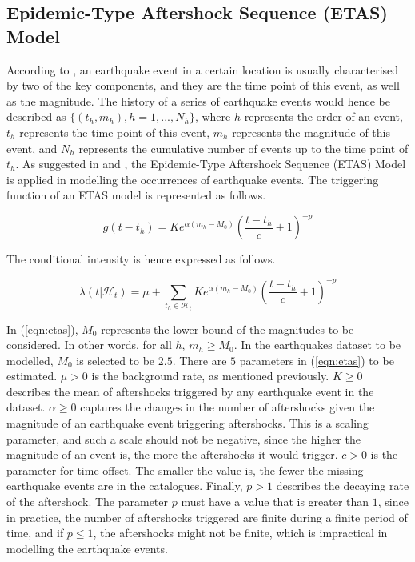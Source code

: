 \documentclass[11pt,twoside]{article}
\numberwithin{Theorem}{section}
\numberwithin{Definition}{section}
\numberwithin{Lemma}{section}
\numberwithin{Algorithm}{section}
\numberwithin{equation}{section}
\begin{document}
\subsection{Epidemic-Type Aftershock Sequence (ETAS) Model}
According to \cite{usgsPredictEarthquakes}, an earthquake event in a certain location is usually characterised by two of the key components, and they are the time point of this event, as well as the magnitude. The history of a series of earthquake events would hence be described as $\{ (t_h, m_h), h = 1, ..., N_h \}$, where $h$ represents the order of an event, $t_h$ represents the time point of this event, $m_h$ represents the magnitude of this event, and $N_h$ represents the cumulative number of events up to the time point of $t_h$. As suggested in \cite{edinburghseismicityhubTemporalModeld} and \cite{serafini2023approximation}, the Epidemic-Type Aftershock Sequence (ETAS) Model is applied in modelling the occurrences of earthquake events. The triggering function of an ETAS model is represented as follows.

\begin{equation}\label{eqn:etas_tri}
g(t-t_h)=Ke^{\alpha(m_h-M_0)}(\frac{t-t_h}{c}+1)^{-p}
\end{equation}

The conditional intensity is hence expressed as follows.


\begin{equation}\label{eqn:etas}
\lambda(t|\mathcal{H}_t) = \mu  + \sum\limits_{{t_h} \in {\mathcal{H}_t}} {Ke^{\alpha(m_h-M_0)}(\frac{t-t_h}{c}+1)^{-p}} 
\end{equation}

In (\ref{eqn:etas}), $M_0$ represents the lower bound of the magnitudes to be considered. In other words, for all $h$, $m_h \geq M_0$. In the earthquakes dataset to be modelled, $M_0$ is selected to be $2.5$. There are $5$ parameters in (\ref{eqn:etas}) to be estimated. $\mu > 0$ is the background rate, as mentioned previously. $K \geq 0$ describes the mean of aftershocks triggered by any earthquake event in the dataset. $\alpha \geq 0$ captures the changes in the number of aftershocks given the magnitude of an earthquake event triggering aftershocks. This is a scaling parameter, and such a scale should not be negative, since the higher the magnitude of an event is, the more the aftershocks it would trigger. $c>0$ is the parameter for time offset. The smaller the value is, the fewer the missing earthquake events are in the catalogues. Finally, $p>1$ describes the decaying rate of the aftershock. The parameter $p$ must have a value that is greater than $1$, since in practice, the number of aftershocks triggered are finite during a finite period of time, and if $p\le 1$, the aftershocks might not be finite, which is impractical in modelling the earthquake events. 
\end{document}
